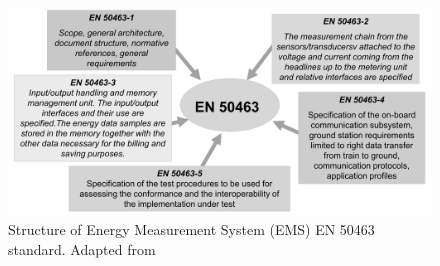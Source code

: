 \begin{figure}[h!]
	\centering
	\includegraphics[width=\textwidth,keepaspectratio]{figures/34.SmartM/gatti2011}
	\caption{Structure of Energy Measurement System (EMS) EN 50463 standard. Adapted from \cite{gatti2011}}
	\label{fig:gatti2011}
\end{figure}






